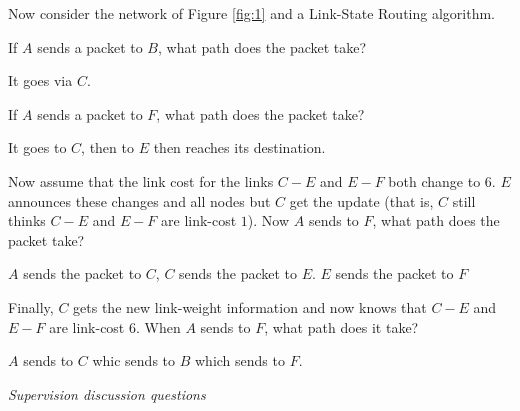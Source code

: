\documentclass{supervision}
\begin{document}
\begin{questions}
\begin{parts}
          Now consider the network of Figure \ref{fig:1} and a Link-State
          Routing algorithm.

          \begin{subparts}
            \subpart If $A$ sends a packet to $B$, what path does the packet
              take?
              \begin{solution}
                It goes via $C$.
              \end{solution}

            \subpart If $A$ sends a packet to $F$, what path does the packet
              take?
              \begin{solution}
                It goes to $C$, then to $E$ then reaches its destination.
              \end{solution}

            \subpart Now assume that the link cost for the links $C-E$ and
              $E-F$ both change to $6$. $E$ announces these changes and all
              nodes but $C$ get the update (that is, $C$ still thinks $C-E$
              and $E-F$ are link-cost $1$). Now $A$ sends to $F$, what path
              does the packet take?
              \begin{solution}
                $A$ sends the packet to $C$, $C$ sends the packet to $E$.
                $E$ sends the packet to $F$
              \end{solution}

            \subpart Finally, $C$ gets the new link-weight information and
              now knows that $C-E$ and $E-F$ are link-cost $6$. When $A$
              sends to $F$, what path does it take?
              \begin{solution}
                $A$ sends to $C$ whic sends to $B$ which sends to $F$.
              \end{solution}

          \end{subparts}
      \end{parts}
    \question \textit{Supervision discussion questions}
\end{questions}
\end{document}
